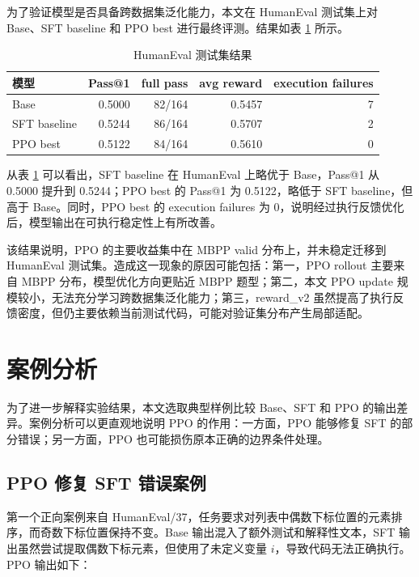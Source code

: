 为了验证模型是否具备跨数据集泛化能力，本文在 HumanEval 测试集上对 Base、SFT baseline 和 PPO best 进行最终评测。结果如表 \ref{tab:humaneval-main} 所示。

\begin{table}[!htp]
  \centering
  \caption{HumanEval 测试集结果}
  \label{tab:humaneval-main}
  \begin{tabular}{lrrrr}
    \toprule
    模型 & Pass@1 & full pass & avg reward & execution failures \\
    \midrule
    Base & 0.5000 & 82/164 & 0.5457 & 7 \\
    SFT baseline & 0.5244 & 86/164 & 0.5707 & 2 \\
    PPO best & 0.5122 & 84/164 & 0.5610 & 0 \\
    \bottomrule
  \end{tabular}
\end{table}

从表 \ref{tab:humaneval-main} 可以看出，SFT baseline 在 HumanEval 上略优于 Base，Pass@1 从 0.5000 提升到 0.5244；PPO best 的 Pass@1 为 0.5122，略低于 SFT baseline，但高于 Base。同时，PPO best 的 execution failures 为 0，说明经过执行反馈优化后，模型输出在可执行稳定性上有所改善。

该结果说明，PPO 的主要收益集中在 MBPP valid 分布上，并未稳定迁移到 HumanEval 测试集。造成这一现象的原因可能包括：第一，PPO rollout 主要来自 MBPP 分布，模型优化方向更贴近 MBPP 题型；第二，本文 PPO update 规模较小，无法充分学习跨数据集泛化能力；第三，reward\_v2 虽然提高了执行反馈密度，但仍主要依赖当前测试代码，可能对验证集分布产生局部适配。

\section{案例分析}

为了进一步解释实验结果，本文选取典型样例比较 Base、SFT 和 PPO 的输出差异。案例分析可以更直观地说明 PPO 的作用：一方面，PPO 能够修复 SFT 的部分错误；另一方面，PPO 也可能损伤原本正确的边界条件处理。

\subsection{PPO 修复 SFT 错误案例}

第一个正向案例来自 HumanEval/37，任务要求对列表中偶数下标位置的元素排序，而奇数下标位置保持不变。Base 输出混入了额外测试和解释性文本，SFT 输出虽然尝试提取偶数下标元素，但使用了未定义变量 $i$，导致代码无法正确执行。PPO 输出如下：

